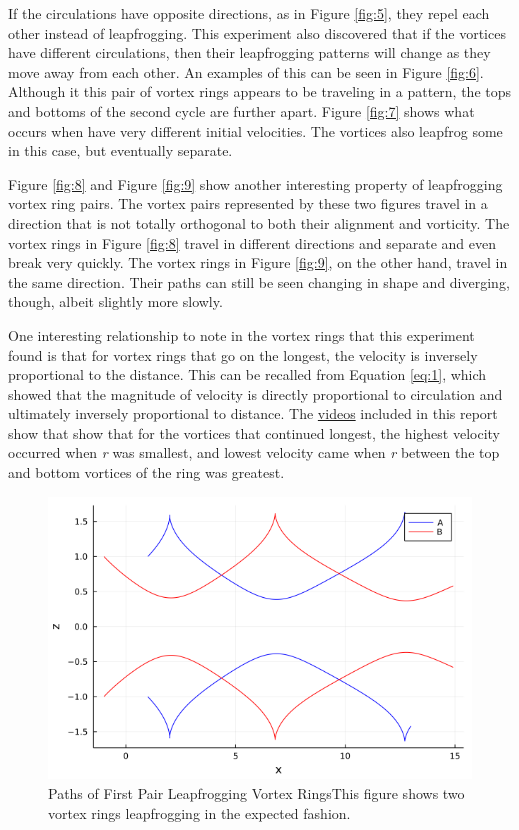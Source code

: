 \documentclass{article}
\begin{document}
{If the circulations have opposite directions, as in Figure \ref{fig:5}, they repel each other instead of leapfrogging. This experiment also discovered that if the vortices have different circulations, then their leapfrogging patterns will change as they move away from each other. An examples of this can be seen in Figure \ref{fig:6}. Although it this pair of vortex rings appears to be traveling in a pattern, the tops and bottoms of the second cycle are further apart. Figure \ref{fig:7} shows what occurs when have very different initial velocities. The vortices also leapfrog some in this case, but eventually separate.\newline

Figure \ref{fig:8} and Figure \ref{fig:9} show another interesting property of leapfrogging vortex ring pairs. The vortex pairs represented by these two figures travel in a direction that is not totally orthogonal to both their alignment and vorticity. The vortex rings in Figure \ref{fig:8} travel in different directions and separate and even break very quickly. The vortex rings in Figure \ref{fig:9}, on the other hand, travel in the same direction. Their paths can still be seen changing in shape and diverging, though, albeit slightly more slowly. \newline

One interesting relationship to note in the vortex rings that this experiment found is that for vortex rings that go on the longest, the velocity is inversely proportional to the distance. This can be recalled from Equation \ref{eq:1}, which showed that the magnitude of velocity is directly proportional to circulation and ultimately inversely proportional to distance. The 
\href{https://imgur.com/U4cND6X,}{videos} included in this report show that show that for the vortices that continued longest, the highest velocity occurred when \emph{r} was smallest, and lowest velocity came when \emph{r} between the top and bottom vortices of the ring was greatest. \newline

\begin{figure}[htb]
	\centering
	\includegraphics[width=\textwidth]{Graph_A.png}
	\caption{Paths of First Pair Leapfrogging Vortex Rings\newline This figure shows two vortex rings leapfrogging in the expected fashion.}
	\label{fig:1}
\end{figure} 

}
\end{document}
